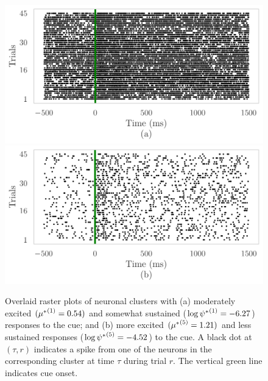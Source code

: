 \documentclass[twoside]{article}
\begin{document}
\begin{figure}[h]
\begin{center}
\includegraphics[scale=0.45]{../img/cue-raster-a.pdf}
\includegraphics[scale=0.45]{../img/cue-raster-b.pdf}
\end{center}
\vspace{-4mm}
\caption{Overlaid raster plots of neuronal clusters with (a) moderately excited $({\mu^*}^{(1)}_{} = 0.54)$ and somewhat sustained ($\log {\psi^*}^{(1)}_{} = -6.27$) responses to the cue; and (b) more excited $({\mu^*}^{(5)}_{} = 1.21)$ and less sustained responses ($\log {\psi^*}^{(5)}_{} = -4.52$) to the cue.  A black dot at $(\tau, r)$ indicates a spike from one of the neurons in the corresponding cluster at time $\tau$ during trial $r$. The vertical green line indicates cue onset.} \label{cue-rasters}
\end{figure}
\end{document}
